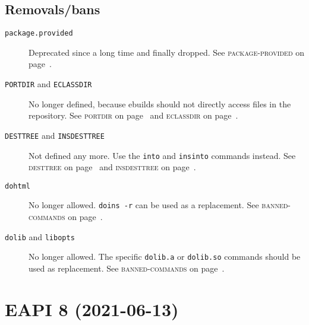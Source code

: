 \documentclass[a4paper,nofoldmark]{leaflet}
\newcommand{\code}[1]{\texttt{#1}}
\newcommand{\featureref}[1]{\textsc{#1} on page~\pageref{feat:#1}}
\begin{document}
\subsection{Removals/bans}
\label{sec:cs:eapi7-removalsbans}
\begin{description}
    \item[\code{package.provided}] Deprecated since a long time and
    finally dropped.
    See \featureref{package-provided}.
    \item[\code{PORTDIR} and \code{ECLASSDIR}] No longer defined,
    because ebuilds should not directly access files in the repository.
    See \featureref{portdir} and \featureref{eclassdir}.
    \item[\code{DESTTREE} and \code{INSDESTTREE}] Not defined any
    more. Use the \code{into} and \code{insinto} commands instead.
    See \featureref{desttree} and \featureref{insdesttree}.
    \item[\code{dohtml}] No longer allowed. \code{doins -r} can be
    used as a replacement.
    See \featureref{banned-commands}.
    \item[\code{dolib} and \code{libopts}] No longer allowed.
    The specific \code{dolib.a} or \code{dolib.so} commands should be
    used as replacement.
    See \featureref{banned-commands}.
\end{description}

\section{EAPI 8 (2021-06-13)}
\label{sec:cs:eapi8}
\end{document}
